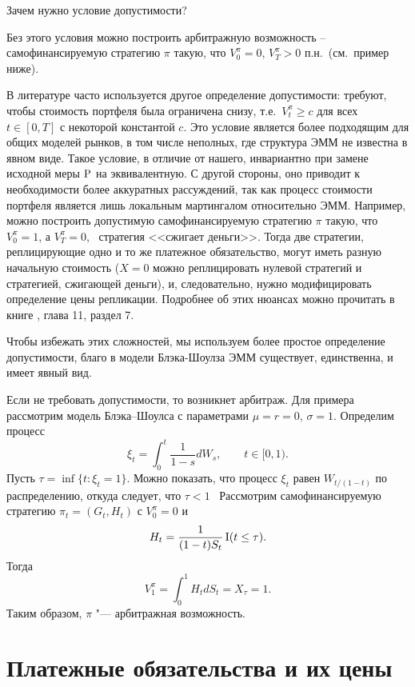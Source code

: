\begin{remark}
\label{9:r:admissible}
Зачем нужно условие допустимости?

Без этого условия можно построить арбитражную возможность -- самофинансируемую стратегию $\pi$ такую, что $V_0^\pi = 0$, $V_T^\pi > 0$ п.н.\ (см.~пример ниже).

В литературе часто используется другое определение допустимости: требуют, чтобы стоимость портфеля была ограничена снизу, т.е.\ $V_t^\pi \ge c$ для всех $t\in[0,T]$ с некоторой константой $c$.
Это условие является более подходящим для общих моделей рынков, в том числе неполных, где структура ЭММ  не известна в явном виде.
Такое условие, в отличие от нашего, инвариантно при замене исходной меры $\P$ на эквивалентную. 
С другой стороны, оно приводит к необходимости более аккуратных рассуждений, так как процесс стоимости портфеля является лишь локальным мартингалом относительно ЭММ.
Например, можно построить допустимую самофинансируемую стратегию $\pi$ такую, что $V_0^\pi  = 1$, а $V_T^\pi = 0$, \te\ стратегия <<сжигает деньги>>.
Тогда две стратегии, реплицирующие одно и то же платежное обязательство, могут иметь разную начальную стоимость ($X=0$ можно реплицировать нулевой стратегий и стратегией, сжигающей деньги), и, следовательно, нужно модифицировать определение цены репликации.
Подробнее об этих нюансах можно прочитать в книге \cite{EberleinKallsen19}, глава 11, раздел 7.

Чтобы избежать этих сложностей, мы используем более простое определение допустимости, благо в модели Блэка-Шоулза ЭММ существует, единственна, и имеет явный вид.
\end{remark}

\begin{example}[$*$]
Если не требовать допустимости, то возникнет арбитраж.
Для примера рассмотрим модель Блэка--Шоулса с параметрами $\mu=r=0$, $\sigma=1$.
Определим процесс 
\[
\xi_t = \int_0^t \frac{1}{1-s} d W_s, \qquad t\in[0,1).
\]
Пусть $\tau = \inf\{t: \xi_t = 1\}$.
Можно показать, что процесс $\xi_t$ равен $W_{{t}/({1-t})}$ по распределению, откуда следует, что $\tau<1$ \as\ 
Рассмотрим самофинансируемую стратегию $\pi_t=(G_t,H_t)$ с $V_0^\pi = 0$ и  
\[
H_t = \frac{1}{(1-t)S_t} \I(t\le \tau).
\]
Тогда
\[
V_1^\pi = \int_0^1 H_t d S_t = X_\tau = 1.
\]
Таким образом, $\pi$ "--- арбитражная возможность.
\end{example}


\section{Платежные обязательства и их цены}

